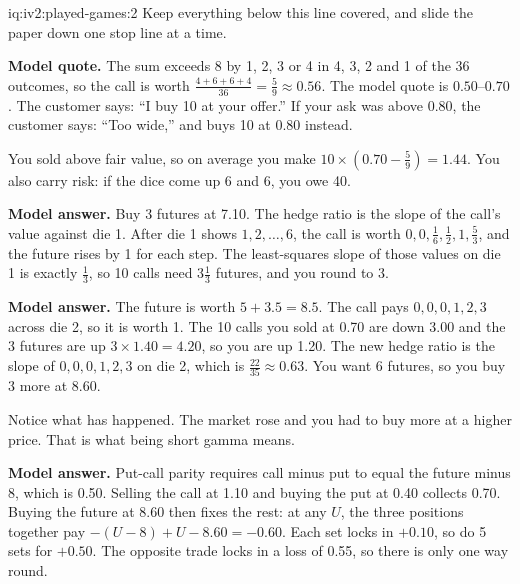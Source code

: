 \begin{solution}{iq:iv2:played-games:2}
Keep everything below this line covered, and slide the paper down one stop line at a time.

\ivstop

\textbf{Model quote.} The sum exceeds 8 by 1, 2, 3 or 4 in 4, 3, 2 and 1 of the 36 outcomes, so the call is worth $\frac{4 + 6 + 6 + 4}{36} = \frac59 \approx 0.56$. The model quote is $0.50$--$0.70$. The customer says: ``I buy 10 at your offer.'' If your ask was above 0.80, the customer says: ``Too wide,'' and buys 10 at 0.80 instead.

You sold above fair value, so on average you make $10 \times (0.70 - \frac59) = 1.44$. You also carry risk: if the dice come up 6 and 6, you owe 40.

\ivstop

\textbf{Model answer.} Buy 3 futures at 7.10. The hedge ratio is the slope of the call's value against die 1. After die 1 shows $1, 2, \dots, 6$, the call is worth $0, 0, \frac16, \frac12, 1, \frac53$, and the future rises by 1 for each step. The least-squares slope of those values on die 1 is exactly $\frac13$, so 10 calls need $3\tfrac13$ futures, and you round to 3.

\ivstop

\textbf{Model answer.} The future is worth $5 + 3.5 = 8.5$. The call pays $0, 0, 0, 1, 2, 3$ across die 2, so it is worth 1. The 10 calls you sold at 0.70 are down 3.00 and the 3 futures are up $3 \times 1.40 = 4.20$, so you are up 1.20. The new hedge ratio is the slope of $0, 0, 0, 1, 2, 3$ on die 2, which is $\frac{22}{35} \approx 0.63$. You want 6 futures, so you buy 3 more at 8.60.

Notice what has happened. The market rose and you had to buy more at a higher price. That is what being short gamma means.

\ivstop

\textbf{Model answer.} Put-call parity requires call minus put to equal the future minus 8, which is 0.50. Selling the call at 1.10 and buying the put at 0.40 collects 0.70. Buying the future at 8.60 then fixes the rest: at any $U$, the three positions together pay $-(U - 8) + U - 8.60 = -0.60$. Each set locks in $+0.10$, so do 5 sets for $+0.50$. The opposite trade locks in a loss of 0.55, so there is only one way round.


\end{solution}
